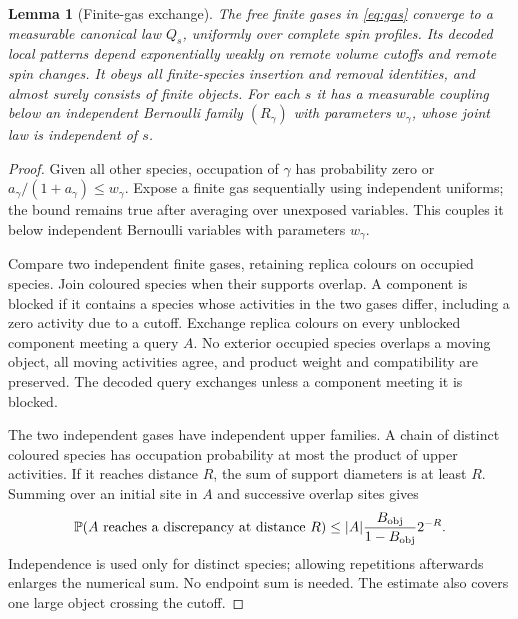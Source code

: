 \documentclass[11pt,reqno]{amsart}
\numberwithin{equation}{section}
\newtheorem{lemma}[theorem]{Lemma}
\theoremstyle{definition}
\theoremstyle{remark}
\newcommand{\Prob}{\mathbb P}
\begin{document}
\begin{lemma}[Finite-gas exchange]\label{lem:gaslimit}
The free finite gases in \eqref{eq:gas} converge to a measurable canonical law $Q_s$, uniformly over complete spin profiles. Its decoded local patterns depend exponentially weakly on remote volume cutoffs and remote spin changes. It obeys all finite-species insertion and removal identities, and almost surely consists of finite objects. For each $s$ it has a measurable coupling below an independent Bernoulli family $(R_\gamma)$ with parameters $w_\gamma$, whose joint law is independent of $s$.
\end{lemma}
\begin{proof}
Given all other species, occupation of $\gamma$ has probability zero or $a_\gamma/(1+a_\gamma)\leq w_\gamma$. Expose a finite gas sequentially using independent uniforms; the bound remains true after averaging over unexposed variables. This couples it below independent Bernoulli variables with parameters $w_\gamma$.

Compare two independent finite gases, retaining replica colours on occupied species. Join coloured species when their supports overlap. A component is blocked if it contains a species whose activities in the two gases differ, including a zero activity due to a cutoff. Exchange replica colours on every unblocked component meeting a query $A$. No exterior occupied species overlaps a moving object, all moving activities agree, and product weight and compatibility are preserved. The decoded query exchanges unless a component meeting it is blocked.

The two independent gases have independent upper families. A chain of distinct coloured species has occupation probability at most the product of upper activities. If it reaches distance $R$, the sum of support diameters is at least $R$. Summing over an initial site in $A$ and successive overlap sites gives
\begin{equation}\label{eq:gasarm}
 \Prob(A\text{ reaches a discrepancy at distance }R)
 \leq |A|\frac{B_{\rm obj}}{1-B_{\rm obj}}2^{-R}.
\end{equation}
Independence is used only for distinct species; allowing repetitions afterwards enlarges the numerical sum. No endpoint sum is needed. The estimate also covers one large object crossing the cutoff.


\end{proof}
\end{document}
